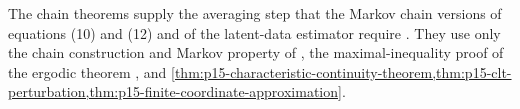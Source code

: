 The chain theorems supply the averaging step that the Markov chain
versions of equations (10) and (12) and of the latent-data estimator
require \cite[Secs.~4.2--4.3]{KassRaftery1995BayesFactors}. They use only the
chain construction and Markov property of
\cite[Sec.~5.2, Theorems~5.2.1 and~5.2.3, pp.~274--275]{DurrettPTEAuthor2019},
the maximal-inequality proof of the ergodic theorem
\cite[Sec.~6.2, pp.~335--336]{DurrettPTEAuthor2019}, and
\cref{thm:p15-characteristic-continuity-theorem,thm:p15-clt-perturbation,thm:p15-finite-coordinate-approximation}.
